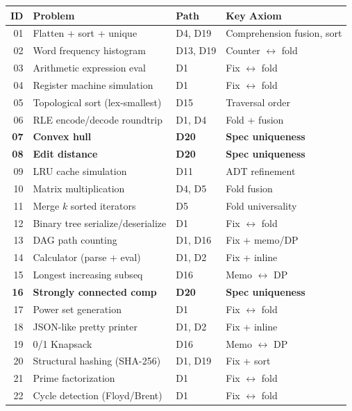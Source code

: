 \begin{center}
\small
\begin{tabular}{r l l l}
  \textbf{ID} & \textbf{Problem} & \textbf{Path} &
  \textbf{Key Axiom} \\
  \hline
  01 & Flatten + sort + unique & D4, D19 & Comprehension fusion, sort \\
  02 & Word frequency histogram & D13, D19 & Counter $\leftrightarrow$ fold \\
  03 & Arithmetic expression eval & D1 & Fix $\leftrightarrow$ fold \\
  04 & Register machine simulation & D1 & Fix $\leftrightarrow$ fold \\
  05 & Topological sort (lex-smallest) & D15 & Traversal order \\
  06 & RLE encode/decode roundtrip & D1, D4 & Fold + fusion \\
  \textbf{07} & \textbf{Convex hull} & \textbf{D20} &
    \textbf{Spec uniqueness} \\
  \textbf{08} & \textbf{Edit distance} & \textbf{D20} &
    \textbf{Spec uniqueness} \\
  09 & LRU cache simulation & D11 & ADT refinement \\
  10 & Matrix multiplication & D4, D5 & Fold fusion \\
  11 & Merge $k$ sorted iterators & D5 & Fold universality \\
  12 & Binary tree serialize/deserialize & D1 & Fix $\leftrightarrow$ fold \\
  13 & DAG path counting & D1, D16 & Fix + memo/DP \\
  14 & Calculator (parse + eval) & D1, D2 & Fix + inline \\
  15 & Longest increasing subseq & D16 & Memo $\leftrightarrow$ DP \\
  \textbf{16} & \textbf{Strongly connected comp} & \textbf{D20} &
    \textbf{Spec uniqueness} \\
  17 & Power set generation & D1 & Fix $\leftrightarrow$ fold \\
  18 & JSON-like pretty printer & D1, D2 & Fix + inline \\
  19 & 0/1 Knapsack & D16 & Memo $\leftrightarrow$ DP \\
  20 & Structural hashing (SHA-256) & D1, D19 & Fix + sort \\
  21 & Prime factorization & D1 & Fix $\leftrightarrow$ fold \\
  22 & Cycle detection (Floyd/Brent) & D1 & Fix $\leftrightarrow$ fold \\

\end{tabular}
\end{center}
